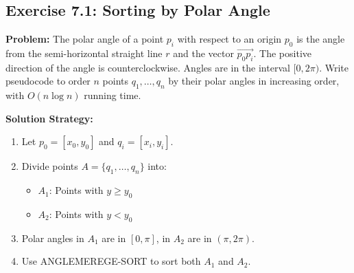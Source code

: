 \subsection{Exercise 7.1: Sorting by Polar Angle}
\textbf{Problem:} The polar angle of a point $p_i$ with respect to an origin $p_0$ is the angle from the semi-horizontal straight line $r$ and the vector $\overrightarrow{p_0p_i}$. The positive direction of the angle is counterclockwise. Angles are in the interval $[0, 2\pi)$. Write pseudocode to order $n$ points $q_1, \ldots, q_n$ by their polar angles in increasing order, with $O(n \log n)$ running time.

\textbf{Solution Strategy:}
\begin{enumerate}[noitemsep]
    \item Let $p_0 = [x_0, y_0]$ and $q_i = [x_i, y_i]$.
    \item Divide points $A = \{q_1, \ldots, q_n\}$ into:
        \begin{itemize}[noitemsep]
            \item $A_1$: Points with $y \geq y_0$
            \item $A_2$: Points with $y < y_0$
        \end{itemize}
    \item Polar angles in $A_1$ are in $[0, \pi]$, in $A_2$ are in $(\pi, 2\pi)$.
    \item Use ANGLEMEREGE-SORT to sort both $A_1$ and $A_2$.
\end{enumerate}

